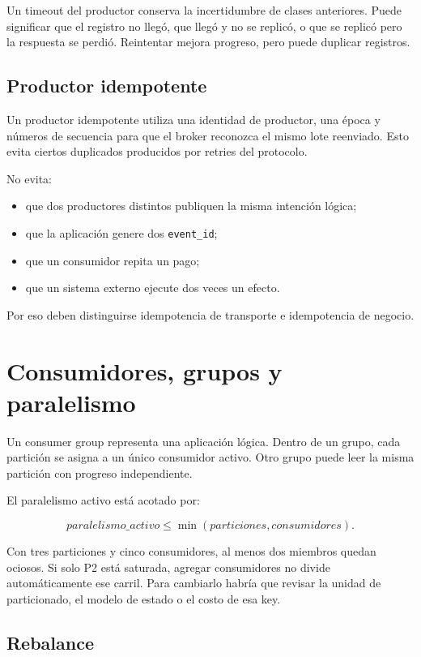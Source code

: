 \documentclass[variant=apuntes,cover=institutional,mode=screen]{ua-engineering-v6-article}
\begin{document}
Un timeout del productor conserva la incertidumbre de clases anteriores. Puede significar que el registro no llegó, que llegó y no se replicó, o que se replicó pero la respuesta se perdió. Reintentar mejora progreso, pero puede duplicar registros.

\subsection{Productor idempotente}

Un productor idempotente utiliza una identidad de productor, una época y números de secuencia para que el broker reconozca el mismo lote reenviado. Esto evita ciertos duplicados producidos por retries del protocolo.

No evita:

\begin{itemize}
\item que dos productores distintos publiquen la misma intención lógica;
\item que la aplicación genere dos \texttt{event\_id};
\item que un consumidor repita un pago;
\item que un sistema externo ejecute dos veces un efecto.
\end{itemize}

Por eso deben distinguirse idempotencia de transporte e idempotencia de negocio.

\section{Consumidores, grupos y paralelismo}

Un consumer group representa una aplicación lógica. Dentro de un grupo, cada partición se asigna a un único consumidor activo. Otro grupo puede leer la misma partición con progreso independiente.

El paralelismo activo está acotado por:

\[
paralelismo\_activo\leq \min(particiones,consumidores).
\]

Con tres particiones y cinco consumidores, al menos dos miembros quedan ociosos. Si solo P2 está saturada, agregar consumidores no divide automáticamente ese carril. Para cambiarlo habría que revisar la unidad de particionado, el modelo de estado o el costo de esa key.

\subsection{Rebalance}
\end{document}

